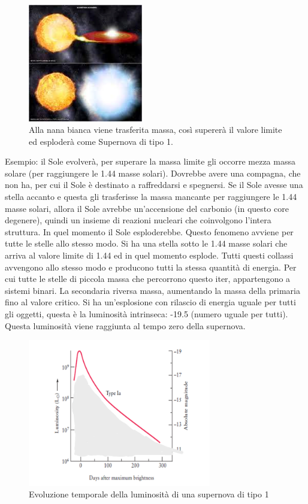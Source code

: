 \documentclass[a4paper,11pt]{article}
\begin{document}
\begin{figure}[h!!]
        \centering
        \includegraphics[width=5cm]{lezione 28 novembre/trasferimentomassa.png}
        \caption{Alla nana bianca viene trasferita massa, così supererà il valore limite ed esploderà come Supernova di tipo 1.}
        \label{lezione 28 novembre/trasferimentomassa.png}
    \end{figure}
Esempio: il Sole evolverà, per superare la massa limite gli occorre mezza massa solare (per raggiungere le 1.44 masse solari). Dovrebbe avere una compagna, che non ha, per cui il Sole è destinato a raffreddarsi e spegnersi. Se il Sole avesse una stella accanto e questa gli trasferisse la massa mancante per raggiungere le 1.44 masse solari, allora il Sole avrebbe un'accensione del carbonio (in questo core degenere), quindi un insieme di reazioni nucleari che coinvolgono l'intera struttura. In quel momento il Sole esploderebbe. Questo fenomeno avviene per tutte le stelle allo stesso modo. Si ha una stella sotto le 1.44 masse solari che arriva al valore limite di 1.44 ed in quel momento esplode. Tutti questi collassi avvengono allo stesso modo e producono tutti la stessa quantità di energia. Per cui tutte le stelle di piccola massa che percorrono questo iter, appartengono a sistemi binari. La secondaria riversa massa, aumentando la massa della primaria fino al valore critico. Si ha un'esplosione con rilascio di energia uguale per tutti gli oggetti, questa è la luminosità intrinseca: -19.5 (numero uguale per tutti). Questa luminosità viene raggiunta al tempo zero della supernova. \\
\begin{figure}[h!!]
        \centering
        \includegraphics[width=8cm]{lezione 28 novembre/supernovatipouno1.png}
        \caption{Evoluzione temporale della luminosità di una supernova di tipo 1}
        \label{lezione 28 novembre/supernovatipouno1.png}
    \end{figure}
\end{document}
